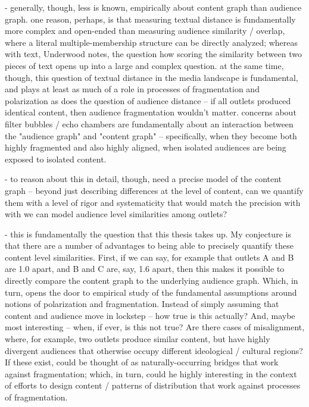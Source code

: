 \documentclass{scrartcl}
\begin{document}
- generally, though, less is known, empirically about content graph than audience graph. one reason, perhaps, is that measuring textual distance is fundamentally more complex and open-ended than measuring audience similarity / overlap, where a literal multiple-membership structure can be directly analyzed; whereas with text, Underwood notes, the question how scoring the similarity between two pieces of text opens up into a large and complex question. at the same time, though, this question of textual distance in the media landscape is fundamental, and plays at least as much of a role in processes of fragmentation and polarization as does the question of audience distance -- if all outlets produced identical content, then audience fragmentation wouldn't matter. concerns about filter bubbles / echo chambers are fundamentally about an interaction between the "audience graph" and "content graph" -- specifically, when they become both highly fragmented and also highly aligned, when isolated audiences are being exposed to isolated content.

- to reason about this in detail, though, need a precise model of the content graph -- beyond just describing differences at the level of content, can we quantify them with a level of rigor and systematicity that would match the precision with with we can model audience level similarities among outlets?

- this is fundamentally the question that this thesis takes up. My conjecture is that there are a number of advantages to being able to precisely quantify these content level similarities. First, if we can say, for example that outlets A and B are 1.0 apart, and B and C are, say, 1.6 apart, then this makes it possible to directly compare the content graph to the underlying audience graph. Which, in turn, opens the door to empirical study of the fundamental assumptions around notions of polarization and fragmentation. Instead of simply assuming that content and audience move in lockstep -- how true is this actually? And, maybe most interesting -- when, if ever, is this not true? Are there cases of misalignment, where, for example, two outlets produce similar content, but have highly divergent audiences that otherwise occupy different ideological / cultural regions? If these exist, could be thought of as naturally-occurring bridges that work against fragmentation; which, in turn, could he highly interesting in the context of efforts to design content / patterns of distribution that work against processes of fragmentation.
\end{document}
